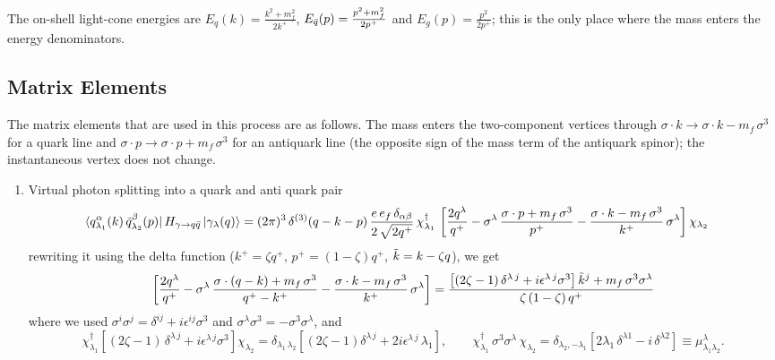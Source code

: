 \documentclass[9pt]{article}
\numberwithin{equation}{section}
\begin{document}
\noindent The on-shell light-cone energies are $E_{q}(k)=\frac{k^{2}+m^{2}_{f}}{2k^{+}}$, $E_{\Bar{q}}(p)=\frac{p^{2}+m^{2}_{f}}{2p^{+}}$ and $E_{g}(p)=\frac{p^{2}}{2p^{+}}$; this is the only place where the mass enters the energy denominators.
\subsection{Matrix Elements}
The matrix elements that are used in this process are as follows. The mass enters the two-component vertices through $\sigma\cdot k\rightarrow \sigma\cdot k - m_{f}\,\sigma^{3}$ for a quark line and $\sigma\cdot p\rightarrow \sigma\cdot p + m_{f}\,\sigma^{3}$ for an antiquark line (the opposite sign of the mass term of the antiquark spinor); the instantaneous vertex does not change.
\begin{enumerate}
\item Virtual photon splitting into a quark and anti quark pair
\begin{align}
    \bra{q^{\alpha}_{\lambda_{1}}(k)\,\Bar{q}^{\beta}_{\lambda_{2}}(p)}H_{\gamma\rightarrow q\Bar{q}}\ket{\gamma_{\lambda}(q)} & = (2\pi)^{3}\, \delta^{(3)}(q-k-p)\, \frac{e\,e_{f}\,\delta_{\alpha\beta}}{2\,\sqrt{2q^{+}}}\, \chi^{\dagger}_{\lambda_{1}}\,\left[\frac{2q^{\lambda}}{q^{+}}-\sigma^{\lambda}\,\frac{\sigma\cdot p+m_{f}\,\sigma^{3}}{p^{+}}-\frac{\sigma\cdot k-m_{f}\,\sigma^{3}}{k^{+}}\,\sigma^{\lambda}\right]\chi_{\lambda_{2}}
\end{align}
rewriting it using the delta function ($k^{+}=\zeta q^{+}$, $p^{+}=(1-\zeta)q^{+}$, $\Tilde{k}=k-\zeta q$), we get
$$\left[\frac{2q^{\lambda}}{q^{+}}-\sigma^{\lambda}\,\frac{\sigma\cdot (q-k)+m_{f}\,\sigma^{3}}{q^{+}-k^{+}}-\frac{\sigma\cdot k-m_{f}\,\sigma^{3}}{k^{+}}\,\sigma^{\lambda}\right] = \frac{\left[(2\zeta -1)\,\delta^{\lambda\,j} + i\epsilon^{\lambda\, j}\sigma^{3}\right]\Tilde{k}^{j}+m_{f}\,\sigma^{3}\sigma^{\lambda}}{\zeta\,(1-\zeta)\,q^{+}}$$
where we used $\sigma^{i}\sigma^{j}=\delta^{ij}+i\epsilon^{ij}\sigma^{3}$ and $\sigma^{\lambda}\sigma^{3}=-\sigma^{3}\sigma^{\lambda}$, and $$\chi^{\dagger}_{\lambda_{1}}\left[(2\zeta -1)\,\delta^{\lambda\,j} + i\epsilon^{\lambda\, j}\sigma^{3}\right]\chi_{\lambda_{2}} = \delta_{\lambda_{1}\,\lambda_{2}}\left[(2\zeta - 1)\delta^{\lambda\,j} +2i\epsilon^{\lambda\,j}\,\lambda_{1}\right],\hspace{2em} \chi^{\dagger}_{\lambda_{1}}\,\sigma^{3}\sigma^{\lambda}\,\chi_{\lambda_{2}} = \delta_{\lambda_{2},-\lambda_{1}}\left[2\lambda_{1}\,\delta^{\lambda 1}-i\,\delta^{\lambda 2}\right]\equiv \mu^{\lambda}_{\lambda_{1}\lambda_{2}}.$$

\end{enumerate}
\end{document}
